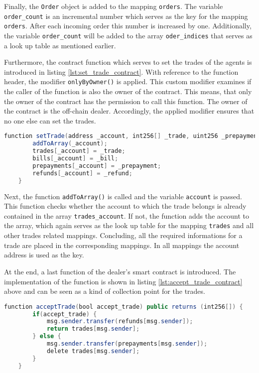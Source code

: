 Finally, the \verb|Order| object is added to the mapping \verb|orders|.
The variable \verb|order_count| is an incremental number which serves as the key for 
the mapping \verb|orders|. After each incoming order this number is increased by one. 
Additionally, the variable \verb|order_count| will be added to the array \verb|oder_indices|
that serves as a look up table as mentioned earlier.

Furthermore, the contract function which serves to set the trades of the agents is introduced in listing \ref{lst:set_trade_contract}.
With reference to the function header, the modifier \verb|onlyByOwner()| is applied.
This custom modifier examines if the caller of the function is also the owner of the contract. This means, that 
only the owner of the contract has the permission to call this function.
The owner of the contract is the off-chain dealer. Accordingly, the applied modifier ensures that no one else can set 
the trades. 

\begin{lstlisting}[float=htbp, label=lst:set_trade_contract, caption=Setting the trades, language=Java]
    function setTrade(address _account, int256[] _trade, uint256 _prepayment, uint256 _bill, uint256 _refund) public onlyByOwner() {
        addToArray(_account);
        trades[_account] = _trade;
        bills[_account] = _bill;
        prepayments[_account] = _prepayment;
        refunds[_account] = _refund;
    }
\end{lstlisting}

Next, the function \verb|addToArray()| is called and the variable \verb|account| is passed. 
This function checks whether the account to which the trade belongs is already contained in the array \verb|trades_account|.
If not, the function adds the account to the array, which again serves as the look up table for the
mapping \verb|trades| and all other trades related mappings.
Concluding, all the required informations for a trade are placed in the corresponding mappings. In all
mappings the account address is used as the key.

At the end, a last function of the dealer's smart contract is introduced.
The implementation of the function is shown in listing \ref{lst:accept_trade_contract} above
and can be seen as a kind of collection point for the trades.

\begin{lstlisting}[float=htbp, label=lst:accept_trade_contract, caption=Collection point of trades, language=Java]
    function acceptTrade(bool accept_trade) public returns (int256[]) {
        if(accept_trade) {
            msg.sender.transfer(refunds[msg.sender]);
            return trades[msg.sender];
        } else {
            msg.sender.transfer(prepayments[msg.sender]);
            delete trades[msg.sender];
        }
    }
\end{lstlisting}


